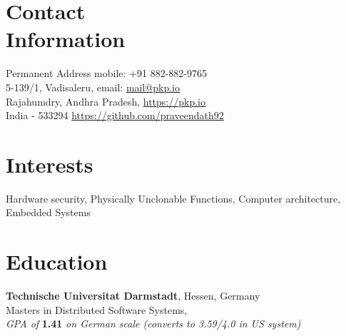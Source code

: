 \documentclass[margin,line]{resume}
\begin{document}


 \vspace{55mm}
\begin{resume}

\section{\mysidestyle Contact\\Information}

    {\sc Permanent Address}				\hfill {\sc mobile}: +91 882-882-9765								\vspace{0mm}\\\vspace{0mm}%
    5-139/1, Vadisaleru,				\hfill {\sc email}: \url{mail@pkp.io}						\vspace{0mm}\\\vspace{0mm}%
    Rajahumdry, Andhra Pradesh,			\hfill {} \url{https://pkp.io}								\vspace{0mm}\\\vspace{0mm}%
    India - 533294				\hfill {}\url{https://github.com/praveendath92}
        
\section{\mysidestyle Interests}
Hardware security, Physically Unclonable Functions, Computer architecture, Embedded Systems
\vspace{-2mm}

\section{\mysidestyle Education}
		
		{\bf Technische Universitat Darmstadt}, Hessen, Germany\\
		Masters in Distributed Software Systems,\\
        \textit{\hspace*{2mm}GPA of} \textbf{1.41} \textit{on German scale (converts to 3.59/4.0 in US system)}
        \vspace{-2mm}
		

\end{resume}
\end{document}
